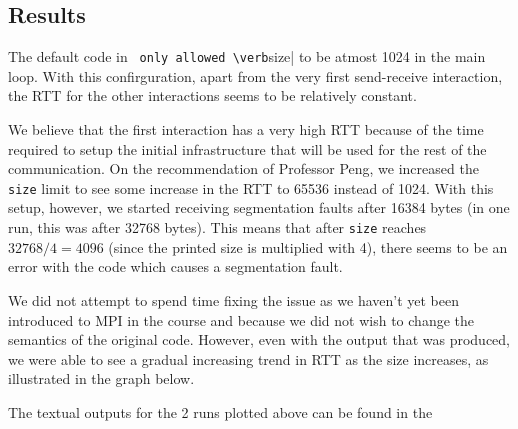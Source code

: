 \documentclass[a4paper,10pt]{article}
\begin{document}
\subsection{Results}
The default code in \verb| only allowed \verb|size| to be atmost 1024 in the main loop. With this confirguration, apart from the very first send-receive interaction, the RTT for the other interactions seems to be relatively constant.


We believe that the first interaction has a very high RTT because of the time required to setup the initial infrastructure that will be used for the rest of the communication. On the recommendation of Professor Peng, we increased the \verb|size| limit to see some increase in the RTT to 65536 instead of 1024. With this setup, however, we started receiving segmentation faults after 16384 bytes (in one run, this was after 32768 bytes). This means that after \verb|size| reaches $32768 / 4 = 4096$ (since the printed size is multiplied with 4), there seems to be an error with the code which causes a segmentation fault. 

We did not attempt to spend time fixing the issue as we haven't yet been introduced to MPI in the course and because we did not wish to change the semantics of the original code. However, even with the output that was produced, we were able to see a gradual increasing trend in RTT as the size increases, as illustrated in the graph below. 


The textual outputs for the 2 runs plotted above can be found in the 



\end{document}
